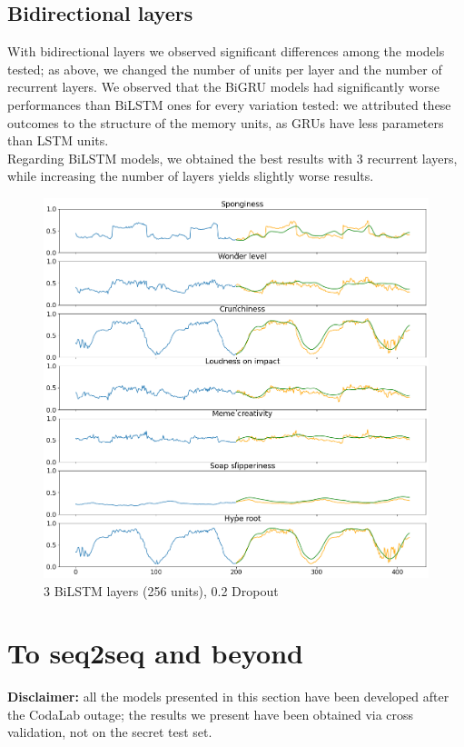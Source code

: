 \documentclass[10.5pt,a4paper,twocolumn]{article}
\begin{document}
\subsection{Bidirectional layers}
With bidirectional layers we observed significant differences among the models tested;
as above, we changed the number of units per layer and the number of recurrent layers.
We observed that the BiGRU models had significantly worse performances than BiLSTM ones 
for every variation tested: we attributed these outcomes to the structure of the memory
units, as GRUs have less parameters than LSTM units.\\
Regarding BiLSTM models, we obtained the best results with 3 recurrent layers, while increasing 
the number of layers yields slightly worse results.
\begin{figure}[h]
    \centering
    \includegraphics[width=\linewidth]{pics/pred_BiLSTM.png}
    \caption{3 BiLSTM layers (256 units), 0.2 Dropout}
\end{figure}

\section{To seq2seq and beyond}
\label{seq2seq}
\textbf{Disclaimer:} all the models presented in this section have been 
developed after the CodaLab outage; the results we present have been obtained
via cross validation, not on the secret test set.\\
\end{document}
